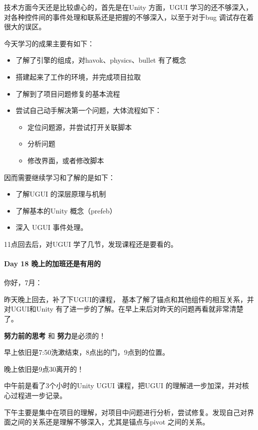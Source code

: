 \documentclass[UTF8,a4paper,8pt]{ctexart}
\begin{document}
 	 	技术方面今天还是比较虐心的，首先是在Unity 方面，UGUI 学习的还不够深入，对各种控件间的事件处理和联系还是把握的不够深入，以至于对于bug 调试存在着很大的误区。
 	 	
 	 	
 	 	今天学习的成果主要有如下：
 	 		\begin{itemize}
 	 			\item 了解了引擎的组成，对havok、physics、bullet 有了概念
 	 			\item 搭建起来了工作的环境，并完成项目拉取
 	 			\item 了解到了项目问题修复的基本流程
 	 			\item 尝试自己动手解决第一个问题，大体流程如下：
 	 				\begin{itemize}
 	 					\item 定位问题源，并尝试打开关联脚本
 	 					\item 分析问题
 	 					\item 修改界面，或者修改脚本
 	 				\end{itemize}
 	 		\end{itemize}
  		
  		因而需要继续学习和了解的是如下：
  			\begin{itemize}
  				\item 了解UGUI 的深层原理与机制
  				\item 了解基本的Unity 概念（prefeb）
  				\item 深入 UGUI 事件处理。 
  			\end{itemize}
  		
  		 11点回去后，对UGUI 学了几节，发现课程还是要看的。
 	 \paragraph{Day 18   晚上的加班还是有用的   \quad     }
 	 	你好，7月：
 	 	
 	 	昨天晚上回去，补了下UGUI的课程， 基本了解了锚点和其他组件的相互关系，并对UGUI和Unity 有了进一步的了解。在早上来后对昨天的问题再看就非常清楚了。
 	 	
 	 	\textbf{努力前的思考} 和 \textbf{努力}是必须的！
 	 	
 	 	早上依旧是7:50洗漱结束，8点出的门，9点到的位置。
 	 	
 	 	晚上依旧是9点30离开的！
 	 	
 	 	中午前是看了3个小时的Unity UGUI 课程，把UGUI 的理解进一步加深，并对核心过程进一步记录。
 	 	
 	 	下午主要是集中在项目的理解，对项目中问题进行分析，尝试修复。发现自己对界面之间的关系还是理解不够深入，尤其是锚点与pivot 之间的关系。
 	 	
\end{document}
